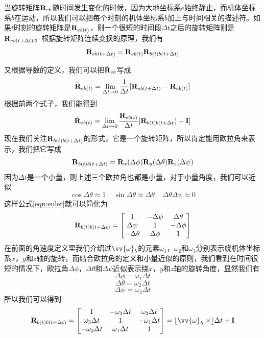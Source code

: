\documentclass[11pt]{article}
\begin{document}
当旋转矩阵${\bf R}_{eb}$随时间发生变化的时候，因为大地坐标系$e$始终静止，而机体坐标系$b$在运动，所以我们可以把每个时刻的机体坐标系$b$加上与时间相关的描述符。如果$t$时刻的旋转矩阵是${\bf R}_{eb(t)}$，则一个很短的时间段$\Delta t$之后的旋转矩阵则是${\bf R}_{eb(t+\Delta t)}$。根据旋转矩阵连续变换的原理，我们有
\begin{equation}\label{eqn:discreterot}
{\bf R}_{eb(t+\Delta t)} = {\bf R}_{eb(t)}{\bf R}_{b(t)b(t+\Delta t)}
\end{equation}

又根据导数的定义，我们可以把$\dot{{\bf R}}_{eb}$写成
$$
\dot{{\bf R}}_{eb(t)} = \lim_{\Delta t \to 0}\frac{1}{\Delta t}[{\bf R}_{eb(t+\Delta t)} - {\bf R}_{eb(t)}]
$$
根据前两个式子，我们能得到
$$
\dot{{\bf R}}_{eb(t)} = \lim_{\Delta t \to 0}\frac{{\bf R}_{eb(t)}}{\Delta t}[{\bf R}_{b(t)b(t+\Delta t}) - {\bf I}]
$$
现在我们关注${\bf R}_{b(t)b(t+\Delta t)}$的形式，它是一个旋转矩阵，所以肯定能用欧拉角来表示，我们把它写成
$$
{\bf R}_{b(t)b(t+\Delta t)} = {\bf R}_x(\Delta\phi){\bf R}_y(\Delta\theta){\bf R}_z(\Delta\psi)
$$
因为$\Delta t$是一个小量，则上述三个欧拉角也都是小量，对于小量角度，我们可以近似
$$
\cos\Delta\theta \approx 1 \ \ \ \ \ \sin\Delta\theta \approx \Delta\theta \ \ \ \ \ \Delta\theta\Delta\psi \approx 0
$$
这样公式\ref{eqn:euler}就可以简化为
$$
{\bf R}_{b(t)b(t+\Delta t)} =
\begin{bmatrix}
1 & -\Delta\psi & \Delta\theta\\
\Delta\psi & 1 & -\Delta\phi \\
-\Delta\theta & \Delta\phi & 1
\end{bmatrix} 
$$
在前面的角速度定义里我们介绍过$\vv{\omega}_b$的元素$\omega_1$，$\omega_2$和$\omega_3$分别表示绕机体坐标系$x$，$y$和$z$轴的旋转，而结合欧拉角的定义和小量近似的原则，我们看到在时间很短的情况下，欧拉角$\Delta\phi$，$\Delta\theta$和$\Delta\psi$近似表示绕$x$，$y$和$z$轴的旋转角度，显然我们有
$$
\Delta\phi = \omega_1\Delta t
$$
$$
\Delta\theta = \omega_2\Delta t
$$
$$
\Delta\psi = \omega_3\Delta t
$$
所以我们可以得到
\begin{equation}\label{eqn:infirot}
{\bf R}_{b(t)b(t+\Delta t)} =
\begin{bmatrix}
1 & -\omega_3\Delta t & \omega_2\Delta t\\
\omega_3\Delta t & 1 & -\omega_1\Delta t \\
-\omega_2\Delta t & \omega_1\Delta t & 1
\end{bmatrix} 
=
\lfloor \vv{\omega}_b \ \times \rfloor \Delta t + {\bf I} 
\end{equation}
\end{document}
